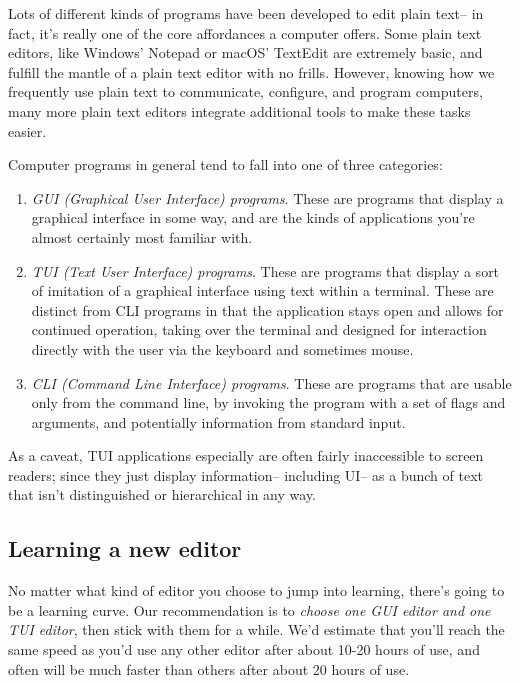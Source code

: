 Lots of different kinds of programs have been developed to edit plain text--
in fact, it's really one of the core affordances a computer offers. Some
plain text editors, like Windows' Notepad or macOS' TextEdit are extremely
basic, and fulfill the mantle of a plain text editor with no frills.
However, knowing how we frequently use plain text to communicate, configure,
and program computers, many more plain text editors integrate additional
tools to make these tasks easier.

Computer programs in general tend to fall into one of three categories:
\begin{enumerate}
  \item {\em GUI (Graphical User Interface) programs}. These are programs that
          display a graphical interface in some way, and are the kinds of applications
          you're almost certainly most familiar with.
  \item {\em TUI (Text User Interface) programs}. These are programs that display
          a sort of imitation of a graphical interface using text within a terminal.
          These are distinct from CLI programs in that the application stays open
          and allows for continued operation, taking over the terminal and designed
          for interaction directly with the user via the keyboard and sometimes mouse.
  \item {\em CLI (Command Line Interface) programs}. These are programs that are usable
          only from the command line, by invoking the program with a set of flags
          and arguments, and potentially information from standard input.
\end{enumerate}

As a caveat, TUI applications especially are often fairly inaccessible
to screen readers; since they just display information-- including UI--
as a bunch of text that isn't distinguished or hierarchical in any way.

\subsection{Learning a new editor}

No matter what kind of editor you choose to jump into learning, there's going
to be a learning curve. Our recommendation is to {\em choose one GUI editor
and one TUI editor}, then stick with them for a while. We'd estimate that you'll
reach the same speed as you'd use any other editor after about 10-20 hours of use,
and often will be much faster than others after about 20 hours of use.

